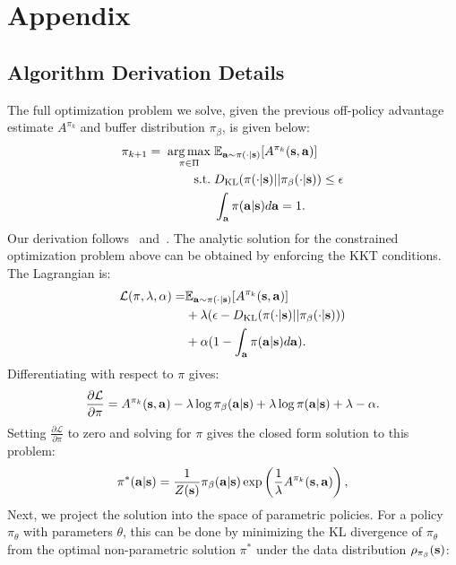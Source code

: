 \documentclass[conference]{IEEEtran}
\begin{document}
\appendix

\section{Appendix}

\subsection{Algorithm Derivation Details} \label{sec:derivation}

The full optimization problem we solve, given the previous off-policy advantage estimate $A^{\pi_k}$ and buffer distribution $\pi_\beta$, is given below:
\begin{align}
    {\pi_{k+1}} = \; \operatorname*{arg\,max}_{\pi \in \Pi} \; & \mathbb{E}_{\mathbf{a} \sim \pi(\cdot|\mathbf{s})}[A^{\pi_k}(\mathbf{s}, \mathbf{a})] \\
    \text{s.t.} \; & D_{\mathrm{KL}}(\pi(\cdot|\mathbf{s})||\pi_\beta(\cdot|\mathbf{s})) \leq \epsilon \\
    & \int_{\mathbf{a}} \pi(\mathbf{a}|\mathbf{s}) d\mathbf{a} = 1.
\end{align}
Our derivation follows~\citet{peters2010reps} and~\citet{peng2019awr}. The analytic solution for the constrained optimization problem above can be obtained by enforcing the KKT conditions. The Lagrangian is:
\begin{align}
    \mathcal{L}(\pi, \lambda, \alpha) = & \mathbb{E}_{\mathbf{a} \sim \pi(\cdot|\mathbf{s})}[A^{\pi_k}(\mathbf{s}, \mathbf{a})] \\ & + \lambda(\epsilon - D_{\mathrm{KL}}(\pi(\cdot|\mathbf{s})||{\pi_\beta}(\cdot|\mathbf{s}))) \\ & + \alpha (1 - \int_{\mathbf{a}} \pi(\mathbf{a}|\mathbf{s}) d\mathbf{a}).
\end{align}
Differentiating with respect to $\pi$ gives:
\begin{align}
    \frac{\partial \mathcal{L}}{\partial \pi} = A^{\pi_k}(\mathbf{s}, \mathbf{a}) - \lambda \log \pi_\beta(\mathbf{a}|\mathbf{s}) + \lambda \log \pi(\mathbf{a}|\mathbf{s}) + \lambda - \alpha.
\end{align}
Setting $\frac{\partial \mathcal{L}}{\partial \pi}$ to zero and solving for $\pi$ gives the closed form solution to this problem:
\begin{align}
    \label{eqn:closedform}
    \pi^*(\at|\st) = \frac{1}{Z(\st)} \pi_\buffer(\at|\st)\exp\left(\frac{1}{\lagrangeawr} A^{\pi_k}(\st, \at)\right),
\end{align}
Next, we project the solution into the space of parametric policies. For a policy $\pi_\theta$ with parameters $\theta$, this can be done by minimizing the KL divergence of $\pi_{\theta}$ from the optimal non-parametric solution $\pi^*$ under the data distribution $\rho_{\pi_\beta}(\mathbf{s})$: 
\end{document}
